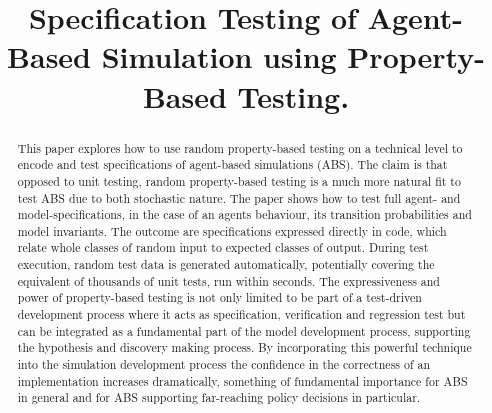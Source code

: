 \documentclass[]{interact}
\theoremstyle{plain}%
\theoremstyle{definition}
\theoremstyle{remark}
\begin{document}

\title{Specification Testing of Agent-Based Simulation using Property-Based Testing.}

\author{
}

\maketitle

\begin{abstract}
This paper explores how to use random property-based testing on a technical level to encode and test specifications of agent-based simulations (ABS). The claim is that opposed to unit testing, random property-based testing is a much more natural fit to test ABS due to both stochastic nature. The paper shows how to test full agent- and model-specifications, in the case of an agents behaviour, its transition probabilities and model invariants. The outcome are specifications expressed directly in code, which relate whole classes of random input to expected classes of output. During test execution, random test data is generated automatically, potentially covering the equivalent of thousands of unit tests, run within seconds. The expressiveness and power of property-based testing is not only limited to be part of a test-driven development process where it acts as specification, verification and regression test but can be integrated as a fundamental part of the model development process, supporting the hypothesis and discovery making process. By incorporating this powerful technique into the simulation development process the confidence in the correctness of an implementation increases dramatically, something of fundamental importance for ABS in general and for ABS supporting far-reaching policy decisions in particular.
\end{abstract}
\end{document}
